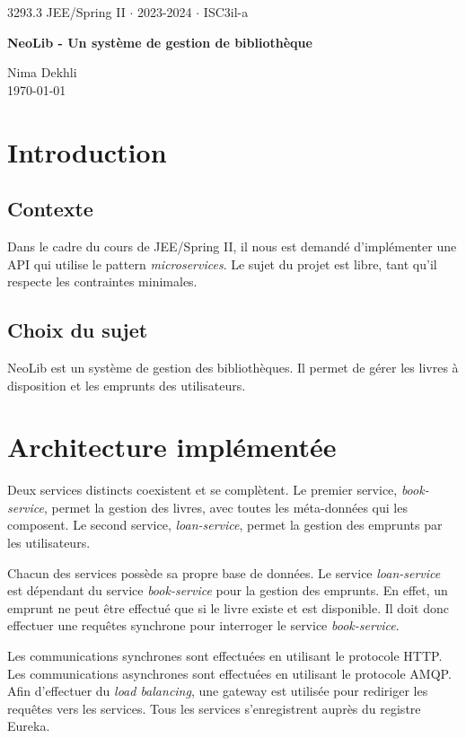 \documentclass[
  french,
  a4paper,
]{scrartcl}
\renewcommand*\maketitle{
    \sffamily
    \Large 3293.3 JEE/Spring II $\cdot$ 2023-2024 $\cdot$ ISC3il-a

    \huge \textbf{NeoLib - Un système de gestion de bibliothèque}
    \vspace{10pt}
    \Large\rmfamily
    
    Nima Dekhli\\
    
    \vspace{8pt}
    \large
    \today

}
\begin{document}
\thispagestyle{firstpage}
\maketitle
\tableofcontents
\newpage
 
\section{Introduction}

\subsection{Contexte}

Dans le cadre du cours de JEE/Spring II, il nous est demandé d'implémenter une API 
qui utilise le pattern \textit{microservices}. Le sujet du projet est libre, tant qu'il 
respecte les contraintes minimales. 


\subsection{Choix du sujet}

NeoLib est un système de gestion des bibliothèques. Il permet de gérer les livres à disposition 
et les emprunts des utilisateurs. 


\section{Architecture implémentée}

Deux services distincts coexistent et se complètent. Le premier service, \textit{book-service}, 
permet la gestion des livres, avec toutes les méta-données qui les composent. Le second service,
\textit{loan-service}, permet la gestion des emprunts par les utilisateurs. 

Chacun des services possède sa propre base de données. Le service \textit{loan-service} est
dépendant du service \textit{book-service} pour la gestion des emprunts. En effet, un emprunt
ne peut être effectué que si le livre existe et est disponible. Il doit donc effectuer 
une requêtes synchrone pour interroger le service \textit{book-service}. 

Les communications synchrones sont effectuées en utilisant le protocole HTTP. Les communications
asynchrones sont effectuées en utilisant le protocole AMQP. Afin d'effectuer du \textit{load balancing},
une gateway est utilisée pour rediriger les requêtes vers les services. Tous les services 
s'enregistrent auprès du registre Eureka.
\end{document}
